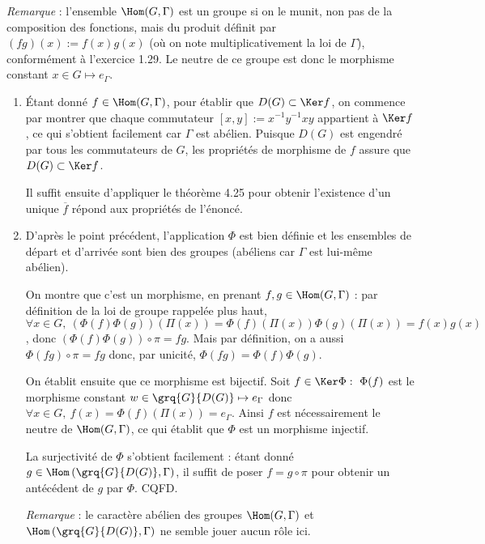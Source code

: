 \emph{Remarque} : l'ensemble $\Hom(G,\Gamma)$ est un groupe si on le munit, non pas de la composition des fonctions, mais du produit définit par $(fg)(x):= f(x) g(x)$ (où on note multiplicativement la loi de $\Gamma$), conformément à l'exercice 1.29.
Le neutre de ce groupe est donc le morphisme constant $x\in G\mapsto e_{\Gamma}$.

\begin{enumerate}
    \item Étant donné $f\in \Hom(G,\Gamma)$, pour établir que $D(G)\subset \Ker f$, on commence par montrer que 
    chaque commutateur $[x,y] := x^{-1}y^{-1}xy$ appartient à $\Ker f$, ce qui s'obtient facilement car $\Gamma$ est abélien.
     Puisque $D(G)$ est engendré par tous les commutateurs de $G$, les propriétés de morphisme de $f$ assure que $D(G)\subset \Ker f$.

     Il suffit ensuite d'appliquer le théorème 4.25 pour obtenir l'existence d'un unique $\overline{f}$ répond aux propriétés de l'énoncé.

    \item D'après le point précédent, l'application $\Phi$ est bien définie et les ensembles de départ et d'arrivée sont bien des groupes (abéliens car $\Gamma$ est lui-même abélien).
    
    On montre que c'est un morphisme, en prenant $f,g \in \Hom(G, \Gamma)$ : par définition de la loi de groupe rappelée plus haut, 
    $\forall x\in G,~ \left(\Phi(f)\Phi(g)\right)\left(\Pi(x)\right) = \Phi(f)\left(\Pi(x)\right) \Phi(g)\left(\Pi(x)\right) = f(x) g(x)$, 
    donc $\left(\Phi(f)\Phi(g)\right)\circ \pi = fg$. Mais par définition, on a aussi $\Phi(fg)\circ \pi = fg$ donc, par unicité, $\Phi(fg) = \Phi(f)\Phi(g)$. 

    On établit ensuite que ce morphisme est bijectif. Soit $f\in \Ker \Phi:~ \Phi(f)$ est le morphisme constant $w \in \grq{G}{D(G)} \mapsto e_{\Gamma}$ donc 
    $\forall x\in G,~ f(x) = \Phi(f)\left(\Pi(x)\right) =  e_{\Gamma}$. Ainsi $f$ est nécessairement le neutre de $\Hom(G,\Gamma)$, ce qui établit que $\Phi$ est un morphisme injectif.

    La surjectivité de $\Phi$ s'obtient facilement : étant donné $g\in \Hom\left(\grq{G}{D(G)}, \Gamma\right)$, il suffit de poser $f=g\circ \pi$ pour obtenir un antécédent de $g$ par $\Phi$.
    CQFD.

    \emph{Remarque} : le caractère abélien des groupes $\Hom(G,\Gamma)$ et $\Hom\left(\grq{G}{D(G)}, \Gamma\right)$ ne semble jouer aucun rôle ici.

\end{enumerate}
